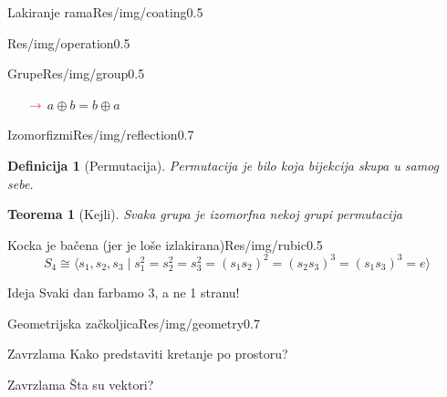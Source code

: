 \documentclass{beamer}
\newtheorem*{teo}{Teorema}
\newtheorem*{df}{Definicija}
\newenvironment{thinker}{\begin{alertblock}{Zavrzlama}}{\end{alertblock}}
\newenvironment{idea}{\begin{block}{Ideja}}{\end{block}}
\begin{document}
    
    \begin{framebg}{Lakiranje rama}{Res/img/coating}{0.5}
    \end{framebg}

    \begin{framebg}{}{Res/img/operation}{0.5}
    \end{framebg}
    \begin{framebg}{Grupe}{Res/img/group}{0.5}
        \begin{enumerate}
            \itemR $(a \circ b) \circ c = a \circ (b \circ c)$
            \itemR $\exists e \forall a \quad a \circ e = e \circ a = a$
            \itemR $\forall a \exists a^{-1}  \quad a \circ a^{-1} = a^{-1} \circ a = e$
            \item[${\color{magenta} \rightarrow}$] $a \oplus b = b \oplus a$
        \end{enumerate}
    \end{framebg}
    \begin{framebg}{Izomorfizmi}{Res/img/reflection}{0.7}
        \begin{df}[Permutacija]
            Permutacija je bilo koja bijekcija skupa u samog sebe.
        \end{df}
        \begin{teo}[Kejli]
            Svaka grupa je izomorfna nekoj grupi permutacija
        \end{teo}
    \end{framebg}
    \begin{framebg}{Kocka je bačena (jer je loše izlakirana)}{Res/img/rubic}{0.5}
        $$S_4 \cong \langle s_1, s_2, s_3 \mid 
            s_1^2 = s_2^2 = s_3^2 = (s_1s_2)^2 = (s_2s_3)^3 = (s_1s_3)^3 = e \rangle
        $$
        \begin{idea}
            Svaki dan farbamo 3, a ne 1 stranu!
        \end{idea}
    \end{framebg}
    \begin{framebg}{Geometrijska začkoljica}{Res/img/geometry}{0.7}
        \begin{thinker}
            Kako predstaviti kretanje po prostoru?
        \end{thinker}
        \begin{thinker}
            Šta su vektori?
        \end{thinker}
    \end{framebg}
\end{document}

